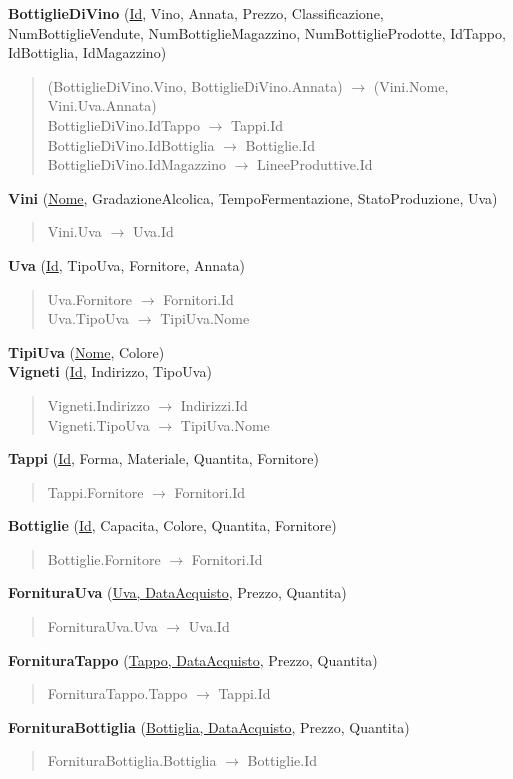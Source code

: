 \textbf{BottiglieDiVino} (\underline{Id}, Vino, Annata, Prezzo, Classificazione, NumBottiglieVendute, NumBottiglieMagazzino, NumBottiglieProdotte, IdTappo, IdBottiglia, IdMagazzino)
\begin{verse}
	(BottiglieDiVino.Vino, BottiglieDiVino.Annata) $\to$ (Vini.Nome, Vini.Uva.Annata)\\
	BottiglieDiVino.IdTappo $\to$ Tappi.Id\\
	BottiglieDiVino.IdBottiglia $\to$ Bottiglie.Id\\
	BottiglieDiVino.IdMagazzino $\to$ LineeProduttive.Id
\end{verse} 
\textbf{Vini} (\underline{Nome}, GradazioneAlcolica, TempoFermentazione, StatoProduzione, Uva)
\begin{verse}
	Vini.Uva $\to$ Uva.Id
\end{verse} 
\textbf{Uva} (\underline{Id}, TipoUva, Fornitore, Annata)
\begin{verse}
	Uva.Fornitore $\to$ Fornitori.Id\\
	Uva.TipoUva $\to$ TipiUva.Nome
\end{verse}
\textbf{TipiUva} (\underline{Nome}, Colore)\\
\textbf{Vigneti} (\underline{Id}, Indirizzo, TipoUva)
\begin{verse}
	Vigneti.Indirizzo $\to$ Indirizzi.Id\\
	Vigneti.TipoUva $\to$ TipiUva.Nome\\
\end{verse} 
\textbf{Tappi} (\underline{Id}, Forma, Materiale, Quantita, Fornitore)
\begin{verse}
	Tappi.Fornitore $\to$ Fornitori.Id
\end{verse}
\textbf{Bottiglie} (\underline{Id}, Capacita, Colore, Quantita, Fornitore)
\begin{verse}
	Bottiglie.Fornitore $\to$ Fornitori.Id
\end{verse}
\textbf{FornituraUva} (\underline{Uva, DataAcquisto}, Prezzo, Quantita)
\begin{verse}
	FornituraUva.Uva $\to$ Uva.Id
\end{verse}
\textbf{FornituraTappo} (\underline{Tappo, DataAcquisto}, Prezzo, Quantita)
\begin{verse}
	FornituraTappo.Tappo $\to$ Tappi.Id
\end{verse} 
\textbf{FornituraBottiglia} (\underline{Bottiglia, DataAcquisto}, Prezzo, Quantita)
\begin{verse}
	FornituraBottiglia.Bottiglia $\to$ Bottiglie.Id
\end{verse} 
